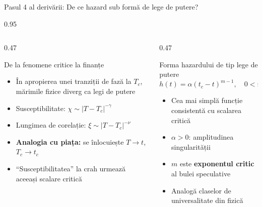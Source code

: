 \documentclass[9pt, aspectratio=169, t]{beamer}
\begin{document}
\begin{frame}{Pasul 4 al derivării: De ce hazard sub formă de lege de putere?}
    \begin{cminipage}{0.95\textwidth}
    {\footnotesize
    \begin{columns}[T]
        \begin{column}{0.47\textwidth}
            \begin{block}{De la fenomene critice la finanțe}
                \begin{itemize}\setlength{\itemsep}{0pt}
                    \item În apropierea unei tranziții de fază la $T_c$, mărimile fizice diverg ca legi de putere
                    \item Susceptibilitate: $\chi \sim |T - T_c|^{-\gamma}$
                    \item Lungimea de corelație: $\xi \sim |T - T_c|^{-\nu}$
                    \item \textbf{Analogia cu piața:} se înlocuiește $T \to t$, $T_c \to t_c$
                    \item ``Susceptibilitatea'' la crah urmează aceeași scalare critică
                \end{itemize}
            \end{block}
        \end{column}
        \begin{column}{0.47\textwidth}
            \begin{alertblock}{Forma hazardului de tip lege de putere}
                \vspace{-2mm}
                $$\boxed{h(t) = \alpha(t_c - t)^{m-1}, \quad 0 < m < 1}$$
                \vspace{-3mm}
                \begin{itemize}\setlength{\itemsep}{0pt}
                    \item Cea mai simplă funcție consistentă cu scalarea critică
                    \item $\alpha > 0$: amplitudinea singularității
                    \item $m$ este \textbf{exponentul critic} al bulei speculative
                    \item Analogă claselor de universalitate din fizică
                \end{itemize}
            \end{alertblock}
        \end{column}
    \end{columns}
}
\end{cminipage}
\end{frame}
\end{document}
